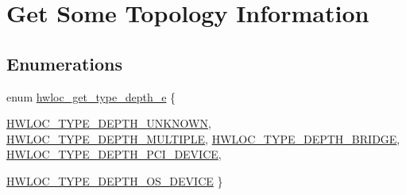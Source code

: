 \hypertarget{a00046}{
\section{Get Some Topology Information}
\label{a00046}
}
\subsection*{Enumerations}
\begin{DoxyCompactItemize}
\item 
enum \hyperlink{a00046_gaf4e663cf42bbe20756b849c6293ef575}{hwloc\_\-get\_\-type\_\-depth\_\-e} \{ \par
\hyperlink{a00046_ggaf4e663cf42bbe20756b849c6293ef575a0565ab92ab72cb0cec91e23003294aad}{HWLOC\_\-TYPE\_\-DEPTH\_\-UNKNOWN}, 
\hyperlink{a00046_ggaf4e663cf42bbe20756b849c6293ef575ae99465995cacde6c210d5fc2e409798c}{HWLOC\_\-TYPE\_\-DEPTH\_\-MULTIPLE}, 
\hyperlink{a00046_ggaf4e663cf42bbe20756b849c6293ef575af93b50182973e4a718d9d4db9e253a90}{HWLOC\_\-TYPE\_\-DEPTH\_\-BRIDGE}, 
\hyperlink{a00046_ggaf4e663cf42bbe20756b849c6293ef575ad8b1516e699b57ce1c8d107fbd2f674c}{HWLOC\_\-TYPE\_\-DEPTH\_\-PCI\_\-DEVICE}, 
\par
\hyperlink{a00046_ggaf4e663cf42bbe20756b849c6293ef575afe9a2131073eebbe129d4aa2928d3f46}{HWLOC\_\-TYPE\_\-DEPTH\_\-OS\_\-DEVICE}
 \}
\end{DoxyCompactItemize}
